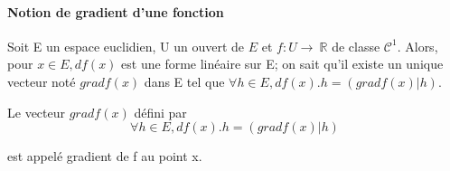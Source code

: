 \paragraph{ Notion de gradient d'une fonction}

Soit E un espace euclidien, U un ouvert de $E$ et $f : U \rightarrow~ \mathbb{R}$ de classe
$\mathcal{C}^1$. Alors, pour $x \in E, df(x)$ est une forme linéaire sur E;
on sait qu'il existe un unique vecteur noté
$grad f(x)$ dans E tel que
$\forall h \in E, df(x).h =
(gradf(x) | h).$

\begin{de}
   Le vecteur $grad f(x)$ défini
par 
\[
\forall h \in E, df(x).h =
(gradf(x) | h)
\] 

est appelé gradient de f au point x.
\end{de}